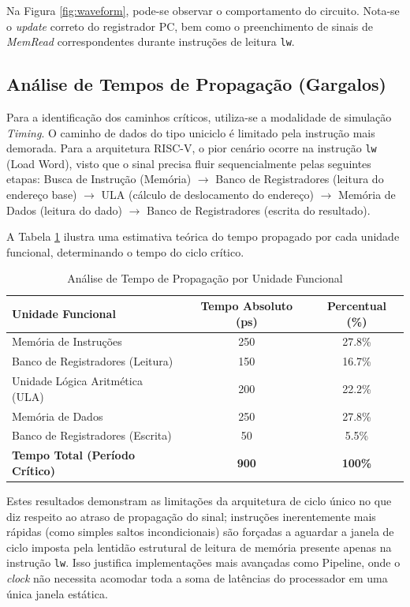 \documentclass[conference]{IEEEtran}
\begin{document}
Na Figura \ref{fig:waveform}, pode-se observar o comportamento do circuito. Nota-se o \textit{update} correto do registrador PC, bem como o preenchimento de sinais de \textit{MemRead} correspondentes durante instruções de leitura \texttt{lw}.

\subsection{Análise de Tempos de Propagação (Gargalos)}
Para a identificação dos caminhos críticos, utiliza-se a modalidade de simulação \textit{Timing}. O caminho de dados do tipo uniciclo é limitado pela instrução mais demorada. Para a arquitetura RISC-V, o pior cenário ocorre na instrução \texttt{lw} (Load Word), visto que o sinal precisa fluir sequencialmente pelas seguintes etapas: Busca de Instrução (Memória) $\rightarrow$ Banco de Registradores (leitura do endereço base) $\rightarrow$ ULA (cálculo de deslocamento do endereço) $\rightarrow$ Memória de Dados (leitura do dado) $\rightarrow$ Banco de Registradores (escrita do resultado). 

A Tabela \ref{tab:tempo_gargalo} ilustra uma estimativa teórica do tempo propagado por cada unidade funcional, determinando o tempo do ciclo crítico.

\begin{table}[!ht]
\centering
\caption{Análise de Tempo de Propagação por Unidade Funcional}
\label{tab:tempo_gargalo}
\begin{tabularx}{\linewidth}{>{\raggedright\arraybackslash}X c c}
\toprule
\textbf{Unidade Funcional} & \textbf{Tempo Absoluto (ps)} & \textbf{Percentual (\%)} \\
\midrule
Memória de Instruções & 250 & 27.8\% \\
Banco de Registradores (Leitura) & 150 & 16.7\% \\
Unidade Lógica Aritmética (ULA) & 200 & 22.2\% \\
Memória de Dados & 250 & 27.8\% \\
Banco de Registradores (Escrita) & 50 & 5.5\% \\
\midrule
\textbf{Tempo Total (Período Crítico)} & \textbf{900} & \textbf{100\%} \\
\bottomrule
\end{tabularx}
\end{table}

Estes resultados demonstram as limitações da arquitetura de ciclo único no que diz respeito ao atraso de propagação do sinal; instruções inerentemente mais rápidas (como simples saltos incondicionais) são forçadas a aguardar a janela de ciclo imposta pela lentidão estrutural de leitura de memória presente apenas na instrução \texttt{lw}. Isso justifica implementações mais avançadas como Pipeline, onde o \textit{clock} não necessita acomodar toda a soma de latências do processador em uma única janela estática.
\end{document}
